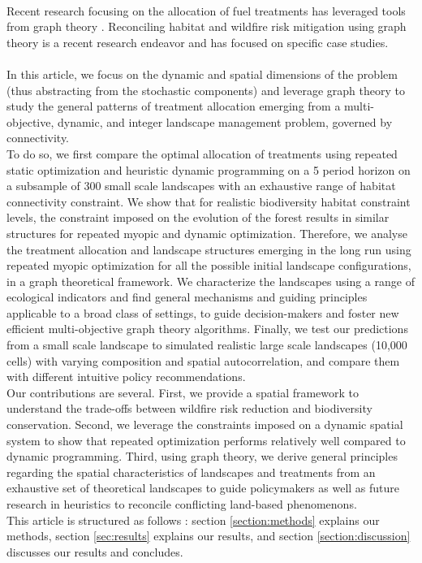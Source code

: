 \\
Recent research focusing on the allocation of fuel treatments has leveraged tools from graph theory \citep{matsypura_wildfire_2018, pais_downstream_2021}. Reconciling habitat and wildfire risk mitigation using graph theory is a recent research endeavor \citep{rachmawati_fuel_2018, yemshanov_exploring_2022} and has focused on specific case studies. 
\\\\
\hspace*{1.5em} In this article, we focus on the dynamic and spatial dimensions of the problem (thus abstracting from the stochastic components) and leverage graph theory to study the general patterns of treatment allocation emerging from a multi-objective, dynamic, and integer landscape management problem, governed by connectivity. \\
To do so, we first compare the optimal allocation of treatments using repeated static optimization and heuristic dynamic programming on a 5 period horizon on a subsample of 300 small scale landscapes with an exhaustive range of habitat connectivity constraint. We show that for realistic biodiversity habitat constraint levels, the constraint imposed on the evolution of the forest results in similar structures for repeated myopic and dynamic optimization. Therefore, we analyse the treatment allocation and landscape structures emerging in the long run using repeated myopic optimization for all the possible initial landscape configurations, in a graph theoretical framework. We characterize the landscapes using a range of ecological indicators and find general mechanisms and guiding principles applicable to a broad class of settings, to guide decision-makers and foster new efficient multi-objective graph theory algorithms. Finally, we test our predictions from a small scale landscape to simulated realistic large scale landscapes (10,000 cells)  with varying composition and spatial autocorrelation, and compare them with different intuitive policy recommendations. 
\\
Our contributions are several. First, we provide a spatial framework to understand the trade-offs between wildfire risk reduction and biodiversity conservation. Second, we leverage the constraints imposed on a dynamic spatial system to show that repeated optimization performs relatively well compared to dynamic programming. Third, using graph theory, we derive general principles regarding the spatial characteristics of landscapes and treatments from an exhaustive set of theoretical landscapes to guide policymakers as well as future research in heuristics to reconcile conflicting land-based phenomenons.
\\
This article is structured as follows : section \ref{section:methods} explains our methods, section \ref{sec:results} explains our results, and section \ref{section:discussion} discusses our results and concludes. 

